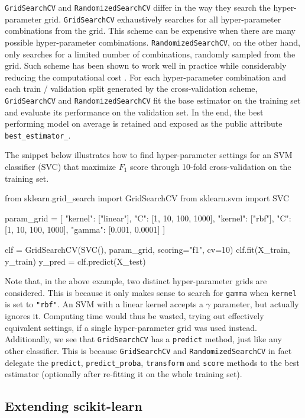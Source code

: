 \documentclass{llncs}
\begin{document}
\texttt{GridSearchCV} and \texttt{RandomizedSearchCV} differ in the way they
search the hyper-parameter grid.  \texttt{GridSearchCV} exhaustively searches
for all hyper-parameter combinations from the grid. This scheme can be expensive
when there are many possible hyper-parameter combinations.
\texttt{RandomizedSearchCV}, on the other hand, only searches for a limited
number of combinations, randomly sampled from the grid. Such scheme has been
shown to work well in practice while considerably reducing the computational
cost \citep{bergstra2012}. For each hyper-parameter combination and each train /
validation split generated by the cross-validation scheme, \texttt{GridSearchCV}
and \texttt{RandomizedSearchCV} fit the base estimator on the training set and
evaluate its performance on the validation set.  In the end, the best performing
model on average is retained and exposed as the public attribute
\texttt{best\_estimator\_}.

The snippet below illustrates how to find
hyper-parameter settings for an SVM classifier (SVC)
that maximize $F_1$ score
through 10-fold cross-validation on the training set.
\begin{pythoncode}
from sklearn.grid_search import GridSearchCV
from sklearn.svm import SVC

param_grid = [
  {"kernel": ["linear"], "C": [1, 10, 100, 1000]},
  {"kernel": ["rbf"], "C": [1, 10, 100, 1000],
   "gamma": [0.001, 0.0001]}
]

clf = GridSearchCV(SVC(), param_grid, scoring="f1", cv=10)
clf.fit(X_train, y_train)
y_pred = clf.predict(X_test)
\end{pythoncode}
Note that, in the above example, two distinct hyper-parameter grids are
considered. This is because it only makes sense to search for \texttt{gamma}
when \texttt{kernel} is set to \texttt{"rbf"}.
An SVM with a linear kernel accepts a $\gamma$ parameter,
but actually ignores it. Computing time would thus be wasted, trying out effectively
equivalent settings, if a single hyper-parameter grid was used instead.
Additionally, we see that
\texttt{GridSearchCV} has a \texttt{predict} method, just like any other classifier.
This is because \texttt{GridSearchCV} and \texttt{RandomizedSearchCV} in fact
delegate the \texttt{predict}, \texttt{predict\_proba}, \texttt{transform} and
\texttt{score} methods to the best estimator
(optionally after re-fitting it on the whole training set).

\subsection{Extending scikit-learn}
\end{document}
